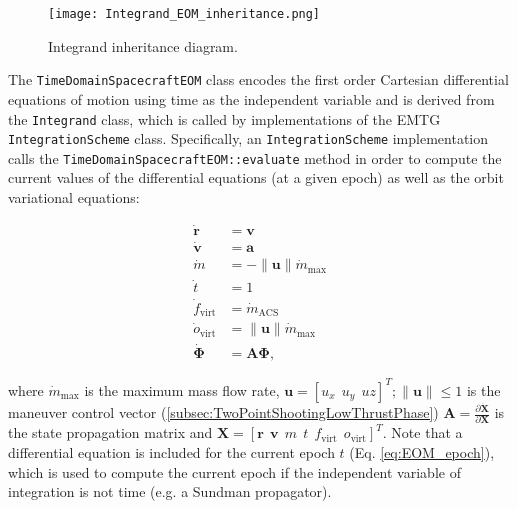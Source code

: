 \begin{figure}[h!]
    \centering
    \texttt{[image: Integrand\_EOM\_inheritance.png]}
    \caption{\label{fig:Integrand_EOM_inheritance} Integrand inheritance diagram.}
\end{figure}

The \texttt{TimeDomainSpacecraftEOM} class encodes the first order Cartesian differential equations of motion using time as the independent variable and is derived from the \texttt{Integrand} class, which is called by implementations of the EMTG \texttt{IntegrationScheme} class. Specifically, an \texttt{IntegrationScheme} implementation calls the \texttt{TimeDomainSpacecraftEOM::evaluate} method in order to compute the current values of the differential equations (at a given epoch) as well as the orbit variational equations:

\begin{align}
\dot{\mathbf{r}} &= \mathbf{v} \label{eq:EOM_v}\\
\dot{\mathbf{v}} &= \mathbf{a} \label{eq:EOM_a} \\
\dot{m} &= -\|\mathbf{u}\|\dot{m}_{\text{max}} \label{eq:EOM_m} \\
\dot{t} &= 1 \label{eq:EOM_epoch} \\
\dot{f}_{\text{virt}} &= \dot{m}_{\text{ACS}} \label{eq:EOM_fuel} \\
\dot{o}_{\text{virt}} &= \|\mathbf{u}\|\dot{m}_{\text{max}} \label{eq:EOM_oxidizer} \\
\dot{\mathbf{\Phi}} &= \mathbf{A} \mathbf{\Phi} \label{eq:variational_eq},
\end{align}

\noindent where $\dot{m}_{\text{max}}$ is the maximum mass flow rate, $\mathbf{u} = \left[ u_x~~u_y~~uz \right]^T; \|\mathbf{u}\| \le 1$ is the maneuver control vector (\ref{subsec:TwoPointShootingLowThrustPhase}) $\mathbf{A} = \frac{\partial \dot{\mathbf{X}}}{\partial \mathbf{X}}$ is the state propagation matrix and $\mathbf{X} = \left[\mathbf{r} ~~ \mathbf{v} ~~ m ~~ t ~~ f_{\text{virt}} ~~ o_{\text{virt}} \right]^T$. Note that a differential equation is included for the current epoch $t$ (Eq. \ref{eq:EOM_epoch}), which is used to compute the current epoch if the independent variable of integration is not time (e.g. a Sundman propagator).

